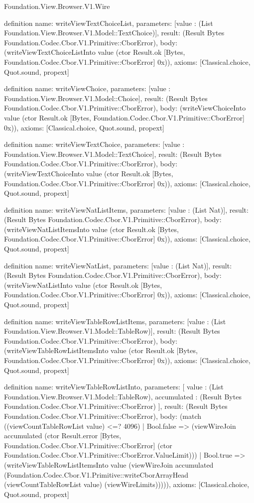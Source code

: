 \begin{lexlean}{Foundation.View.Browser.V1.Wire}
\begin{semanticmodule}
definition{
  name: writeViewTextChoiceList,
  parameters: [value : (List Foundation.View.Browser.V1.Model::TextChoice)],
  result: (Result Bytes Foundation.Codec.Cbor.V1.Primitive::CborError),
  body: (writeViewTextChoiceListInto value (ctor Result.ok [Bytes, Foundation.Codec.Cbor.V1.Primitive::CborError] 0x)),
  axioms: [Classical.choice, Quot.sound, propext]
}

definition{
  name: writeViewChoice,
  parameters: [value : Foundation.View.Browser.V1.Model::Choice],
  result: (Result Bytes Foundation.Codec.Cbor.V1.Primitive::CborError),
  body: (writeViewChoiceInto value (ctor Result.ok [Bytes, Foundation.Codec.Cbor.V1.Primitive::CborError] 0x)),
  axioms: [Classical.choice, Quot.sound, propext]
}

definition{
  name: writeViewTextChoice,
  parameters: [value : Foundation.View.Browser.V1.Model::TextChoice],
  result: (Result Bytes Foundation.Codec.Cbor.V1.Primitive::CborError),
  body: (writeViewTextChoiceInto value (ctor Result.ok [Bytes, Foundation.Codec.Cbor.V1.Primitive::CborError] 0x)),
  axioms: [Classical.choice, Quot.sound, propext]
}

definition{
  name: writeViewNatListItems,
  parameters: [value : (List Nat)],
  result: (Result Bytes Foundation.Codec.Cbor.V1.Primitive::CborError),
  body: (writeViewNatListItemsInto value (ctor Result.ok [Bytes, Foundation.Codec.Cbor.V1.Primitive::CborError] 0x)),
  axioms: [Classical.choice, Quot.sound, propext]
}

definition{
  name: writeViewNatList,
  parameters: [value : (List Nat)],
  result: (Result Bytes Foundation.Codec.Cbor.V1.Primitive::CborError),
  body: (writeViewNatListInto value (ctor Result.ok [Bytes, Foundation.Codec.Cbor.V1.Primitive::CborError] 0x)),
  axioms: [Classical.choice, Quot.sound, propext]
}

definition{
  name: writeViewTableRowListItems,
  parameters: [value : (List Foundation.View.Browser.V1.Model::TableRow)],
  result: (Result Bytes Foundation.Codec.Cbor.V1.Primitive::CborError),
  body: (writeViewTableRowListItemsInto value (ctor Result.ok [Bytes, Foundation.Codec.Cbor.V1.Primitive::CborError] 0x)),
  axioms: [Classical.choice, Quot.sound, propext]
}

definition{
  name: writeViewTableRowListInto,
  parameters: [
    value : (List Foundation.View.Browser.V1.Model::TableRow),
    accumulated : (Result Bytes Foundation.Codec.Cbor.V1.Primitive::CborError)
  ],
  result: (Result Bytes Foundation.Codec.Cbor.V1.Primitive::CborError),
  body: (match ((viewCountTableRowList value) <=? 4096)
    | Bool.false => (viewWireJoin accumulated (ctor Result.error [Bytes, Foundation.Codec.Cbor.V1.Primitive::CborError] (ctor Foundation.Codec.Cbor.V1.Primitive::CborError.ValueLimit)))
    | Bool.true => (writeViewTableRowListItemsInto value (viewWireJoin accumulated (Foundation.Codec.Cbor.V1.Primitive::writeCborArrayHead (viewCountTableRowList value) (viewWireLimits))))),
  axioms: [Classical.choice, Quot.sound, propext]
}


\end{semanticmodule}
\end{lexlean}
